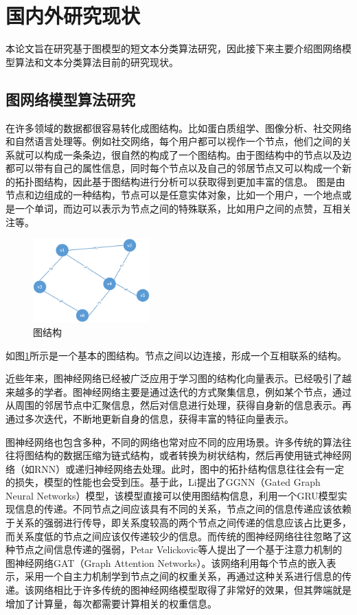 \section{国内外研究现状}
本论文旨在研究基于图模型的短文本分类算法研究，因此接下来主要介绍图网络模型算法和文本分类算法目前的研究现状。

\subsection{图网络模型算法研究}
在许多领域的数据都很容易转化成图结构。比如蛋白质组学、图像分析、社交网络和自然语言处理等。例如社交网络，每个用户都可以视作一个节点，他们之间的关系就可以构成一条条边，很自然的构成了一个图结构。由于图结构中的节点以及边都可以带有自己的属性信息，同时每个节点以及自己的邻居节点又可以构成一个新的拓扑图结构，因此基于图结构进行分析可以获取得到更加丰富的信息。
图是由节点和边组成的一种结构，节点可以是任意实体对象，比如一个用户，一个地点或是一个单词，而边可以表示为节点之间的特殊联系，比如用户之间的点赞，互相关注等。
\begin{figure}[htb]%
	\setlength{\belowcaptionskip}{0pt}
	\centering
	\includegraphics[width=0.4\textwidth]{pic/1-1.png}
	\caption{图结构}
	\label{graphStruc}
\end{figure}
如图\ref{graphStruc}所示是一个基本的图结构。节点之间以边连接，形成一个互相联系的结构。

近些年来，图神经网络已经被广泛应用于学习图的结构化向量表示。已经吸引了越来越多的学者。图神经网络主要是通过迭代的方式聚集信息，例如某个节点，通过从周围的邻居节点中汇聚信息，然后对信息进行处理，获得自身新的信息表示。再通过多次迭代，不断地更新自身的信息，获得丰富的特征向量表示。

图神经网络也包含多种，不同的网络也常对应不同的应用场景。许多传统的算法往往将图结构的数据压缩为链式结构，或者转换为树状结构，然后再使用链式神经网络（如RNN）或递归神经网络去处理。此时，图中的拓扑结构信息往往会有一定的损失，模型的性能也会受到压。基于此，Li提出了GGNN（Gated Graph Neural Networks）模型，该模型直接可以使用图结构信息，利用一个GRU模型实现信息的传递。不同节点之间应该具有不同的关系，节点之间的信息传递应该依赖于关系的强弱进行传导，即关系度较高的两个节点之间传递的信息应该占比更多，而关系度低的节点之间应该仅传递较少的信息。而传统的图神经网络往往忽略了这种节点之间信息传递的强弱，Petar Velickovic等人提出了一个基于注意力机制的图神经网络GAT（Graph Attention Networks）。该网络利用每个节点的嵌入表示，采用一个自主力机制学到节点之间的权重关系，再通过这种关系进行信息的传递。该网络相比于许多传统的图神经网络模型取得了非常好的效果，但其弊端就是增加了计算量，每次都需要计算相关的权重信息。

